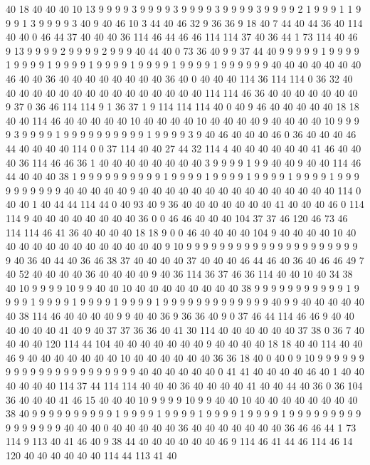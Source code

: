 40 18 40 40 40 10 13 9 9 9 9 3 9 9 9 9 3 9 9 9
9 3 9 9 9 9 3 9 9 9 9 2 1 9 9 9 1 1 9 9
9 1 3 9 9 9 9 3 40 9 40 46 10 3 44 40 46 32 9 36
36 9 18 40 7 44 40 44 36 40 114 40 40 0 46 44 37 40 40 40
36 114 46 44 46 46 114 114 37 40 36 44 1 73 114 40 46 9 13 9
9 9 9 2 9 9 9 9 2 9 9 9 40 44 40 0 73 36 40 9
9 37 44 40 9 9 9 9 9 1 9 9 9 9 1 9 9 9 9 1
9 9 9 9 1 9 9 9 9 1 9 9 9 9 1 9 9 9 9 1
9 9 9 9 9 9 40 40 40 40 40 40 40 46 40 40 36 40 40 40
40 40 40 40 40 36 40 0 40 40 40 114 36 114 114 0 36 32 40 40
40 40 40 40 40 40 40 40 40 40 40 40 40 40 114 114 46 36 40 40
40 40 40 40 40 9 37 0 36 46 114 114 9 1 36 37 1 9 114 114
114 40 0 40 9 46 40 40 40 40 40 18 18 40 40 114 46 40 40 40
40 40 10 40 40 40 40 10 40 40 40 40 9 40 40 40 40 10 9 9
9 9 3 9 9 9 9 1 9 9 9 9 9 9 9 9 9 9 1 9
9 9 9 3 9 40 46 40 40 40 46 0 36 40 40 40 46 44 40 40
40 40 114 0 0 37 114 40 40 27 44 32 114 4 40 40 40 40 40 40
41 46 40 40 40 36 114 46 46 36 1 40 40 40 40 40 40 40 40 3
9 9 9 9 1 9 9 40 40 9 40 40 114 46 44 40 40 40 38 1
9 9 9 9 9 9 9 9 9 9 1 9 9 9 9 1 9 9 9 9
1 9 9 9 9 1 9 9 9 9 1 9 9 9 9 9 9 9 9 9
9 40 40 40 40 40 9 40 40 40 40 40 40 40 40 40 40 40 40 40
40 40 114 0 40 40 1 40 44 44 114 44 0 40 93 40 9 36 40 40
40 40 40 40 40 41 40 40 40 46 0 114 114 9 40 40 40 40 40 40
40 40 36 0 0 46 46 40 40 40 104 37 37 46 120 46 73 46 114 114
46 41 36 40 40 40 40 18 18 9 0 0 46 40 40 40 40 104 9 40
40 40 40 10 40 40 40 40 40 40 40 40 40 40 40 40 40 9 10 9
9 9 9 9 9 9 9 9 9 9 9 9 9 9 9 9 9 9 9 9
9 40 36 40 44 40 36 46 38 37 40 40 40 40 37 40 40 40 46 44
46 40 36 40 46 46 49 7 40 52 40 40 40 40 36 40 40 40 40 9
40 36 114 36 37 46 36 114 40 40 10 40 34 38 40 10 9 9 9 9
10 9 9 40 40 10 40 40 40 40 40 40 40 40 38 9 9 9 9 9
9 9 9 9 9 9 1 9 9 9 9 1 9 9 9 9 1 9 9 9
9 1 9 9 9 9 1 9 9 9 9 9 9 9 9 9 9 9 9 9
40 9 9 40 40 40 40 40 40 38 114 46 40 40 40 40 9 9 40 40
36 9 36 36 40 9 0 37 46 44 114 46 46 9 40 40 40 40 40 40
41 40 9 40 37 37 36 36 40 41 30 114 40 40 40 40 40 40 37 38
0 36 7 40 40 40 40 120 114 44 104 40 40 40 40 40 40 40 9 40
40 40 40 18 18 40 40 114 40 40 46 9 40 40 40 40 40 40 40 10
40 40 40 40 40 40 36 36 18 40 0 40 0 9 10 9 9 9 9 9
9 9 9 9 9 9 9 9 9 9 9 9 9 9 9 9 9 40 40 40
40 40 40 0 41 41 40 40 40 40 46 40 1 40 40 40 40 40 40 114
37 44 114 114 40 40 40 36 40 40 40 40 41 40 40 44 40 36 0 36
104 36 40 40 40 41 46 15 40 40 40 10 9 9 9 9 10 9 9 40
40 10 40 40 40 40 40 40 40 40 38 40 9 9 9 9 9 9 9 9
9 9 1 9 9 9 9 1 9 9 9 9 1 9 9 9 9 1 9 9
9 9 1 9 9 9 9 9 9 9 9 9 9 9 9 9 9 9 9 40
40 40 0 40 40 40 40 40 36 40 40 40 40 40 40 40 36 46 46 44
1 73 114 9 113 40 41 46 40 9 38 44 40 40 40 40 40 40 46 9
114 46 41 44 46 114 46 14 120 40 40 40 40 40 40 114 44 113 41 40
